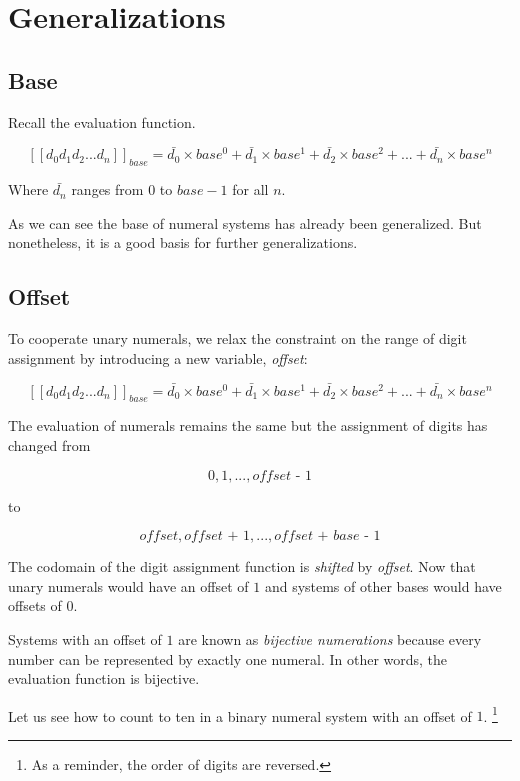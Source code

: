 \documentclass[../thesis.tex]{subfiles}
\begin{document}
\chapter{Generalizations}\label{generalizations}


\section{Base}

Recall the evaluation function.

$$
    [\![d_0d_1d_2...d_n]\!]_{base}
    =
    \bar{d_0}\times base^0 + \bar{d_1}\times base^1 + \bar{d_2}\times base^2 + ... + \bar{d_n}\times base^n
$$

Where $ \bar{d_n} $ ranges from $ 0 $ to $ base - 1 $ for all $ n $.

As we can see the base of numeral systems has already been generalized.
But nonetheless, it is a good basis for further generalizations.

\section{Offset}

To cooperate unary numerals, we relax the constraint on the range of digit assignment
by introducing a new variable, \textit{offset}:

$$
    [\![d_0d_1d_2...d_n]\!]_{base}
    =
    \bar{d_0}\times base^0 + \bar{d_1}\times base^1 + \bar{d_2}\times base^2 + ... + \bar{d_n}\times base^n
$$

The evaluation of numerals remains the same but the assignment of digits has changed from

$$
    { 0, 1, ..., \textit{offset - 1} }
$$

to

$$
    { \textit{offset}, \textit{offset + 1}, ..., \textit{offset + base - 1} }
$$

The codomain of the digit assignment function is \textit{shifted} by \textit{offset}.
Now that unary numerals would have an offset of $ 1 $
and systems of other bases would have offsets of $ 0 $.

Systems with an offset of $ 1 $ are known as \textit{bijective numerations}
because every number can be represented by exactly one numeral. In other words,
the evaluation function is bijective.

Let us see how to count to ten in a binary numeral system with an offset of $ 1 $.
\footnote{As a reminder, the order of digits are reversed.}
\end{document}
